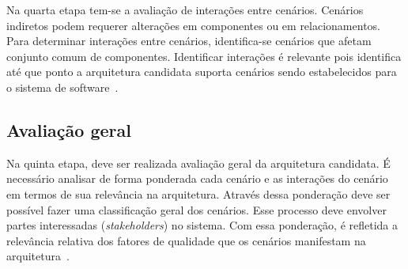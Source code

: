 Na quarta etapa tem-se a avaliação de interações entre cenários. Cenários indiretos podem requerer alterações em componentes ou em relacionamentos. Para determinar interações entre cenários, identifica-se cenários que afetam conjunto comum de componentes. Identificar interações é relevante pois identifica até que ponto a arquitetura candidata suporta cenários sendo estabelecidos para o sistema de software~\cite{scenario_methods}. 

\subsection{Avaliação geral}

Na quinta etapa, deve ser realizada avaliação geral da arquitetura candidata. É necessário analisar de forma ponderada cada cenário e as interações do cenário em termos de sua relevância na arquitetura. Através dessa ponderação deve ser possível fazer uma classificação geral dos cenários. Esse processo deve envolver partes interessadas (\emph{stakeholders}) no sistema. Com essa ponderação, é refletida a relevância relativa dos fatores de qualidade que os cenários manifestam na arquitetura~\cite{scenario_methods}.
